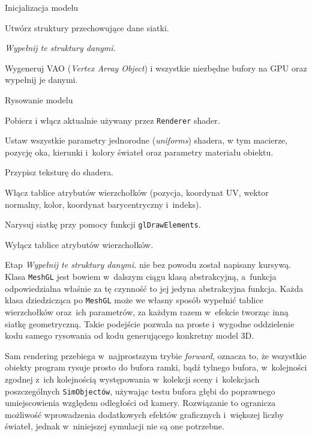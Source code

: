 		\begin{algorithm}[H]
			\label{alg_4_4}
			\caption{Inicjalizacja modelu}	
			
			Utwórz struktury przechowujące dane siatki.
			
			\emph{Wypełnij te struktury danymi.}
			
			Wygeneruj VAO (\emph{Vertex Array Object}) i wszystkie niezbędne bufory na GPU oraz wypełnij je danymi.
		\end{algorithm}
		
		\begin{algorithm}[H]
			\label{alg_4_5}
			\caption{Rysowanie modelu}	
			
			{
			Pobierz i włącz aktualnie używany przez \texttt{Renderer} shader.
			
			Ustaw wszystkie parametry jednorodne (\emph{uniforms}) shadera, w tym macierze, pozycję oka, kierunki i~kolory świateł oraz parametry materiału obiektu.
			
			Przypisz teksturę do shadera.
			
			Włącz tablice atrybutów wierzchołków (pozycja, koordynat UV, wektor normalny, kolor, koordynat barycentryczny i~indeks).
			
			Narysuj siatkę przy pomocy funkcji \texttt{glDrawElements}.
			
			Wyłącz tablice atrybutów wierzchołków.
			}
			
		\end{algorithm}
		
		Etap \emph{Wypełnij te struktury danymi.} nie bez powodu został napisany kursywą. Klasa \texttt{MeshGL} jest bowiem w~dalszym ciągu klasą abstrakcyjną, a~funkcja odpowiedzialna właśnie za tę czynność to jej jedyna abstrakcyjna funkcja. Każda klasa dziedzicząca po \texttt{MeshGL} może we własny sposób wypełnić tablice wierzchołków oraz~ich parametrów, za każdym razem w~efekcie tworząc inną siatkę geometryczną. Takie podejście pozwala na proste i~wygodne oddzielenie kodu samego rysowania od kodu generującego konkretny model 3D.
		
		Sam rendering przebiega w~najprostszym trybie \emph{forward}, oznacza to, że wszystkie obiekty program rysuje prosto do bufora ramki, bądź tylnego bufora, w~kolejności zgodnej z~ich kolejnością występowania w~kolekcji sceny i~kolekcjach poszczególnych \texttt{SimObjectów}, używając testu bufora głębi do poprawnego umiejscowienia względem odległości od kamery. Rozwiązanie to ogranicza możliwość wprowadzenia dodatkowych efektów graficznych i~większej liczby świateł, jednak w~niniejszej symulacji nie są one potrzebne.
		
